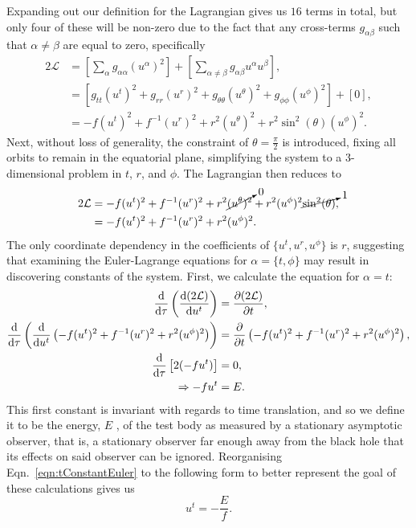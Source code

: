 Expanding out our definition for the Lagrangian gives us $16$ terms in total, but only four of these will be non-zero due to the fact that any cross-terms $g_{\alpha\beta}$ such that $\alpha \neq \beta$ are equal to zero, specifically
\begin{align}
    2\mathcal{L}&=\left[\sum_{\alpha}g_{\alpha\alpha}(u^\alpha)^2\right]+\left[\sum_{\alpha\neq\beta}g_{\alpha\beta}u^\alpha u^\beta\right],\\
    &=\left[g_{tt}(u^t)^2+g_{rr}(u^r)^2+g_{\theta\theta}(u^\theta)^2+g_{\phi\phi}(u^\phi)^2\right]+\left[0\right],\\
    &=-f(u^t)^2+f^{-1}(u^r)^2+r^2(u^\theta)^2+r^2\sin^2(\theta)(u^\phi)^2.
\end{align}
Next, without loss of generality, the constraint of $\theta=\frac{\pi}{2}$ is introduced, fixing all orbits to remain in the equatorial plane, simplifying the system to a 3-dimensional problem in $t$, $r$, and $\phi$.
The Lagrangian then reduces to
\begin{align}
2\mathcal{L}&=-f(u^t)^2+f^{-1}(u^r)^2+r^2\cancelto{0}{(u^\theta)^2}+r^2(u^\phi)^2\cancelto{1}{\sin^2(\theta)},\\
&=-f(u^t)^2+f^{-1}(u^r)^2+r^2(u^\phi)^2 \label{eqn:reduclagran}.
\end{align}
The only coordinate dependency in the coefficients of $\{u^t, u^r, u^\phi\}$ is $r$, suggesting that examining the Euler-Lagrange equations for $\alpha=\{t,\phi\}$ may result in discovering constants of the system.
First, we calculate the equation for $\alpha=t$:
\begin{align}
    \dv{}{\tau}\left(\dv{(2\mathcal{L})}{u^t} \right)&=\pdv{(2\mathcal{L})}{t},\\
    \dv{}{\tau}\left(\dv{}{u^t}\left( -f(u^t)^2+f^{-1}(u^r)^2+r^2(u^\phi)^2\right) \right)&=\pdv{}{t}\left( -f(u^t)^2+f^{-1}(u^r)^2+r^2(u^\phi)^2\right),\\
    \dv{}{\tau}\left[2(-fu^t) \right]&=0,\\
    \Rightarrow -fu^t&=E. \label{eqn:tConstantEuler}
\end{align}
This first constant is invariant with regards to time translation, and so we define it to be the energy, $E$ \cite{introCondensed}, of the test body as measured by a stationary asymptotic observer, that is, a stationary observer far enough away from the black hole that its effects on said observer can be ignored.
Reorganising Eqn.~\eqref{eqn:tConstantEuler} to the following form to better represent the goal of these calculations gives us
\begin{equation}\label{eqn:ut}
u^t=-\frac{E}{f}.
\end{equation}
